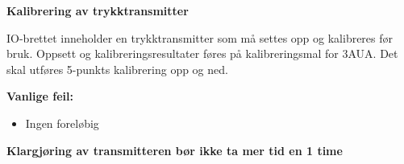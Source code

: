 \vskip 10pt






\vfil \eject

\noindent
\textbf{Kalibrering av trykktransmitter}

\vskip 5pt

IO-brettet inneholder en trykktransmitter som må settes opp og kalibreres før bruk. Oppsett og kalibreringsresultater føres på kalibreringsmal for 3AUA. Det skal utføres 5-punkts kalibrering opp og ned. 



\filbreak


\vskip 10pt


\vskip 10pt

\textbf{Vanlige feil:}
\begin{itemize}[noitemsep]
	\item Ingen foreløbig
\end{itemize}


\vskip 10pt

\textbf{Klargjøring av transmitteren bør ikke ta mer tid en 1 time}




\vfil \eject
























\vfil \eject

\noindent

\vskip 20pt


